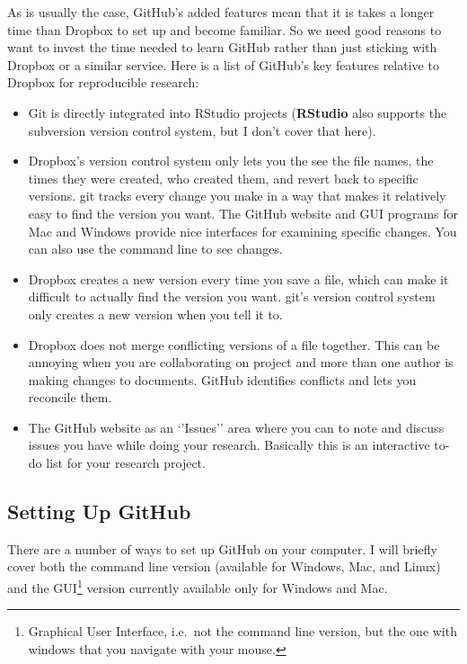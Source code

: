 \documentclass[ChapterTOCs,krantz1]{krantz}\usepackage{graphicx, color}
\begin{document}
As is usually the case, GitHub's added features mean that it is
takes a longer time than Dropbox to set up and become familiar.
So we need good reasons to want to invest the time needed to learn
GitHub rather than just sticking with Dropbox or a
similar service. Here is a list of GitHub's key features
relative to Dropbox for reproducible research:

\begin{itemize}
\item
  Git is directly integrated into RStudio projects
  (\textbf{RStudio} also supports the subversion version
  control system, but I don't cover that here).
\item
  Dropbox's version control system only lets you the see the
  file names, the times they were created, who created them, and revert
  back to specific versions. git tracks every change you make
  in a way that makes it relatively easy to find the version you want.
  The GitHub website and GUI programs for Mac and Windows
  provide nice interfaces for examining specific changes. You can also
  use the command line to see changes.
\item
  Dropbox creates a new version every time you save a file,
  which can make it difficult to actually find the version you want.
  git's version control system only creates a new version when
  you tell it to.
\item
  Dropbox does not merge conflicting versions of a file
  together. This can be annoying when you are collaborating on project
  and more than one author is making changes to documents.
  GitHub identifies conflicts and lets you reconcile them.
\item
  The GitHub website as an `'Issues'' area where you can to
  note and discuss issues you have while doing your research. Basically
  this is an interactive to-do list for your research project.
\end{itemize}

\subsection{Setting Up GitHub}

There are a number of ways to set up GitHub on your computer. I
will briefly cover both the command line version (available for Windows,
Mac, and Linux) and the GUI\footnote{Graphical User Interface, i.e.~not
  the command line version, but the one with windows that you navigate
  with your mouse.} version currently available only for Windows and
Mac.
\end{document}
